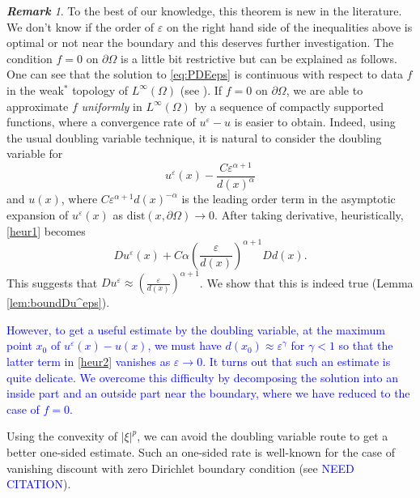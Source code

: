 \documentclass[12pt,reqno]{amsart}
\numberwithin{figure}{section}
\theoremstyle{plain}
\theoremstyle{remark}
\newtheorem{rem}{\bf{Remark}}
\numberwithin{equation}{section}
\begin{document}
\begin{rem} To the best of our knowledge, this theorem is new in the literature. We don't know if the order of $\varepsilon$ on the right hand side of the inequalities above is optimal or not near the boundary and this deserves further investigation. The condition $f = 0$ on $\partial\Omega$ is a little bit restrictive but can be explained as follows. One can see that the solution to \eqref{eq:PDEeps} is continuous with respect to data $f$ in the weak$^*$ topology of $L^\infty(\Omega)$ (see \cite{Lasry1989}). If $f = 0$ on $\partial\Omega$, we are able to approximate $f$ \emph{uniformly} in $L^\infty(\Omega)$ by a sequence of compactly supported functions, where a convergence rate of $u^\varepsilon-u$ is easier to obtain. Indeed, using the usual doubling variable technique, it is natural to consider the doubling variable for
\begin{equation}\label{heur1}
    u^\varepsilon(x) - \frac{C\varepsilon^{\alpha+1}}{d(x)^{\alpha}}
\end{equation}
and $u(x)$, where $C\varepsilon^{\alpha+1}d(x)^{-\alpha}$ is the leading order term in the asymptotic expansion of $u^\varepsilon(x)$ as $\mathrm{dist}(x,\partial\Omega)\to 0$. After taking derivative, heuristically, \eqref{heur1} becomes
\begin{equation}\label{heur2}
    Du^\varepsilon(x) + C\alpha \left(\frac{\varepsilon}{d(x)}\right)^{\alpha+1}Dd(x).
\end{equation}
This suggests that $Du^\varepsilon \approx \left(\frac{\varepsilon}{d(x)}\right)^{\alpha+1}$. We show that this is indeed true (Lemma \ref{lem:boundDu^eps}).

\textcolor{blue}{
However, to get a useful estimate by the doubling variable, at the maximum point $x_0$ of $u^\varepsilon(x) - u(x)$, we must have $d(x_0)\approx \varepsilon^{\gamma}$ for $\gamma<1$ so that the latter term in \eqref{heur2} vanishes as $\varepsilon\to 0$. It turns out that such an estimate is quite delicate. We overcome this difficulty by decomposing the solution into an inside part and an outside part near the boundary, where we have reduced to the case of $f=0$.}
\end{rem}

Using the convexity of $|\xi|^p$, we can avoid the doubling variable route to get a better one-sided estimate. Such an one-sided rate is well-known for the case of vanishing discount with zero Dirichlet boundary condition (see \textcolor{blue}{NEED CITATION}).
\end{document}
